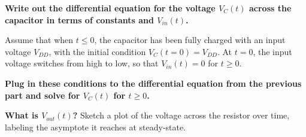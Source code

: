 \begin{enumerate}

\qitem \textbf{Write out the differential equation for the voltage $V_{C}(t)$ across the capacitor in terms of constants and $V_{in}(t)$.}

\ws{
\vspace{50px}
}

\qitem 
Assume that when $t\leq 0$, the capacitor has been fully charged with an input voltage $V_{DD}$, with the initial condition $V_C(t=0) = V_{DD}$.
At $t=0$, the input voltage switches from high to low, so that $V_{in}(t) = 0$ for $t \geq 0$.

\textbf{Plug in these conditions to the differential equation from the previous part and solve for $V_{C}(t)$ for $t \geq 0$.}

\ws{
\vspace{50px}
}


\qitem \textbf{What is $V_{out}(t)$?} Sketch a plot of the voltage across the resistor over time, labeling the asymptote it reaches at steady-state.

\ws{
\vspace{30px}
}

\end{enumerate}
